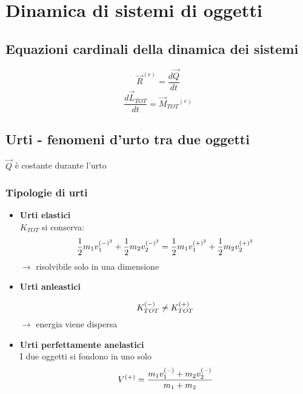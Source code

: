 \section{Dinamica di sistemi di oggetti}

\subsection{Equazioni cardinali della dinamica dei sistemi}

\begin{equation}
    \boxed{\vec{R}^{(e)} = \frac{d\vec{Q}}{dt}}
\end{equation}
\begin{equation}
    \boxed{\frac{d\vec{L}_{TOT}}{dt} = \vec{M}_{TOT}{^{(e)}}}
\end{equation}

\subsection{Urti - fenomeni d'urto tra due oggetti}
$\vec{Q}$ è costante durante l'urto
\subsubsection{Tipologie di urti}
\begin{itemize}
    \item   \textbf{Urti elastici} \\
            $K_{TOT}$ si conserva:
            \begin{equation*}
                \frac{1}{2}m_1v_1^{\tiny{(-)}^2} + 
                \frac{1}{2}m_2v_2^{\tiny{(-)}^2} = 
                \frac{1}{2}m_1v_1^{\tiny{(+)}^2} + 
                \frac{1}{2}m_2v_2^{\tiny{(+)}^2} 
            \end{equation*}
            $\to$ risolvibile solo in una dimensione
    \item   \textbf{Urti anleastici}
    
            \begin{equation*}
                K_{TOT}^{\tiny{(-)}} \neq K_{TOT}^{\tiny{(+)}}
            \end{equation*}
            $\to$ energia viene dispersa
    \item   \textbf{Urti perfettamente anelastici} \\
            I due oggetti si fondono in uno solo
            \begin{equation*}
                V^{\tiny{(+)}} = \frac{m_1v_1^{\tiny{(-)}} + m_2v_2^{\tiny{(-)}}}{m_1 + m_2}
            \end{equation*}
\end{itemize}


